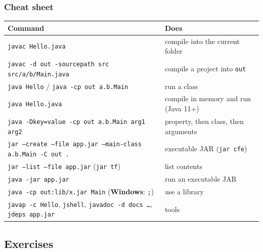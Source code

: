 \documentclass[aspectratio=169,10pt,compress]{beamer}
\newcommand{\win}{\textbf{Windows}}
\begin{document}
\begin{frame}[t,fragile] \frametitle{Cheat sheet}
  \footnotesize
  \begin{tabular}{@{}L{0.5\textwidth}L{0.44\textwidth}@{}}
    \toprule
    \textbf{Command} & \textbf{Does} \\
    \midrule
    \texttt{javac Hello.java}                               & compile into the current folder \\
    \texttt{javac -d out -sourcepath src src/a/b/Main.java} & compile a project into \texttt{out} \\
    \texttt{java Hello} / \texttt{java -cp out a.b.Main}     & run a class \\
    \texttt{java Hello.java}                                & compile in memory and run (Java 11+) \\
    \texttt{java -Dkey=value -cp out a.b.Main arg1 arg2}    & property, then class, then arguments \\
    \texttt{jar --create --file app.jar --main-class a.b.Main -C out .} & executable JAR (\texttt{jar cfe}) \\
    \texttt{jar --list --file app.jar} (\texttt{jar tf})    & list contents \\
    \texttt{java -jar app.jar}                              & run an executable JAR \\
    \texttt{java -cp out:lib/x.jar Main} (\win: \texttt{;}) & use a library \\
    \texttt{javap -c Hello}, \texttt{jshell}, \texttt{javadoc -d docs \dots}, \texttt{jdeps app.jar} & tools \\
    \bottomrule
  \end{tabular}
\end{frame}

\subsection[Exercises]{Exercises}
\end{document}

